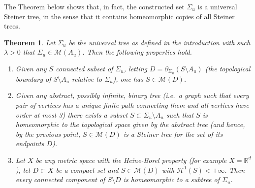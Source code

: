 \documentclass{amsart}
\newcommand{\RR}{\mathbb R}
\renewcommand{\H}{\mathcal H}
\newcommand{\M}{\mathcal{M}}
\renewcommand{\H}{\mathcal{H}}
\newtheorem{theorem}{Theorem}[section]
\theoremstyle{definition}
\theoremstyle{remark}
\begin{document}
The Theorem below shows that, in fact, the constructed set 
$\Sigma_u$ is a universal Steiner tree, 
in the sense that it contains homeomorphic copies of all 
Steiner trees.

\begin{theorem}
\label{th:universality}%
Let $\Sigma_u$ be the universal tree as defined in the introduction
with such $\lambda>0$ that $\Sigma_u\in \M(A_u)$.
Then the following properties hold.
\begin{enumerate}
  \item[(i)]
Given any $S$ connected subset of $\Sigma_u$, 
letting $D=\partial_{\Sigma_u}(S\setminus A_u)$ (the topological boundary of $S\setminus A_u$ relative 
to $\Sigma_u$),
one has $S\in \M(D)$.
  \item[(ii)]
Given any abstract, possibly infinite, binary tree (i.e.\ a graph 
such that every pair of vertices has a unique finite path connecting them and all vertices 
have order at most 3) 
there exists a subset $S\subset \Sigma_u\setminus A_u$
such that $S$ is homeomorphic to the topological space given by the abstract tree 
(and hence, by the previous point, $S\in \M(D)$ is a Steiner tree for 
the set of its endpoints $D$).
\item[(iii)] 
  Let $X$ be any metric space with the Heine-Borel property
  (for example $X=\RR^d$), let $D\subset X$ be a compact set 
  and $S\in \M(D)$ with $\H^1(S)<+\infty$.
  Then every connected component of $S\setminus D$ 
  is homeomorphic to a subtree of $\Sigma_u$.
\end{enumerate}
\end{theorem}
\end{document}
